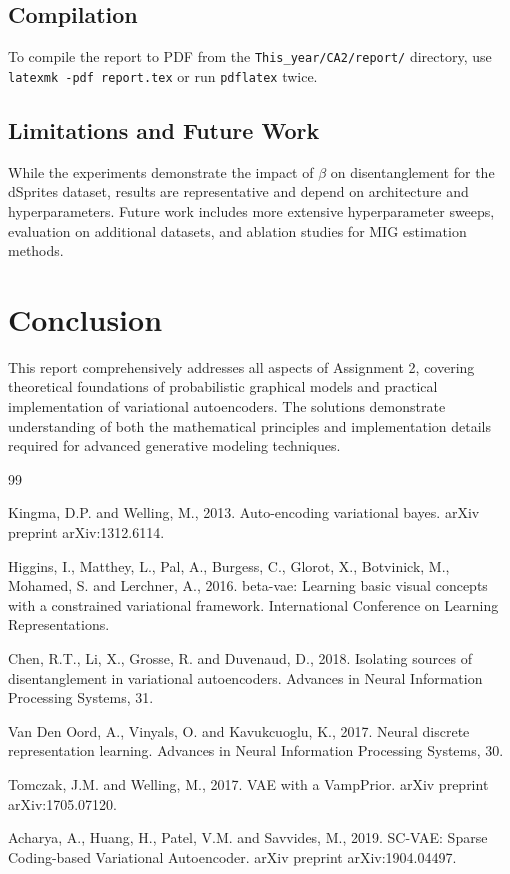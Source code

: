 \documentclass[conference]{IEEEtran}
\begin{document}
\subsection{Compilation}
To compile the report to PDF from the \texttt{This_year/CA2/report/} directory, use \texttt{latexmk -pdf report.tex} or run \texttt{pdflatex} twice.

\subsection{Limitations and Future Work}
While the experiments demonstrate the impact of $\beta$ on disentanglement for the dSprites dataset, results are representative and depend on architecture and hyperparameters. Future work includes more extensive hyperparameter sweeps, evaluation on additional datasets, and ablation studies for MIG estimation methods.

\section{Conclusion}

This report comprehensively addresses all aspects of Assignment 2, covering theoretical foundations of probabilistic graphical models and practical implementation of variational autoencoders. The solutions demonstrate understanding of both the mathematical principles and implementation details required for advanced generative modeling techniques.

\begin{thebibliography}{99}

Kingma, D.P. and Welling, M., 2013. Auto-encoding variational bayes. arXiv preprint arXiv:1312.6114.

Higgins, I., Matthey, L., Pal, A., Burgess, C., Glorot, X., Botvinick, M., Mohamed, S. and Lerchner, A., 2016. beta-vae: Learning basic visual concepts with a constrained variational framework. International Conference on Learning Representations.

Chen, R.T., Li, X., Grosse, R. and Duvenaud, D., 2018. Isolating sources of disentanglement in variational autoencoders. Advances in Neural Information Processing Systems, 31.

Van Den Oord, A., Vinyals, O. and Kavukcuoglu, K., 2017. Neural discrete representation learning. Advances in Neural Information Processing Systems, 30.

Tomczak, J.M. and Welling, M., 2017. VAE with a VampPrior. arXiv preprint arXiv:1705.07120.

Acharya, A., Huang, H., Patel, V.M. and Savvides, M., 2019. SC-VAE: Sparse Coding-based Variational Autoencoder. arXiv preprint arXiv:1904.04497.

\end{thebibliography}
\end{document}
